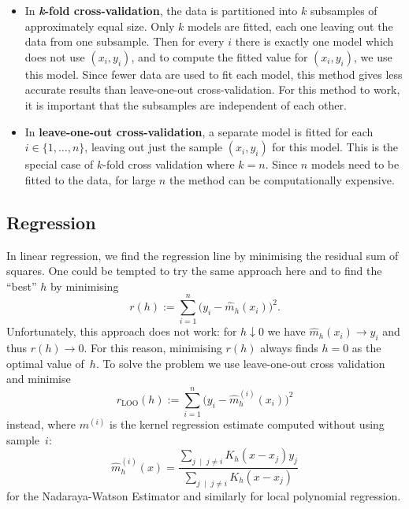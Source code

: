 \documentclass[
  a4paper,
]{article}
\theoremstyle{definition}
\theoremstyle{definition}
\theoremstyle{definition}
\theoremstyle{definition}
\theoremstyle{remark}
\begin{document}
\begin{itemize}
\item
  In \textbf{\emph{k}-fold cross-validation}, the data is partitioned into
  \(k\) subsamples of approximately equal size. Only \(k\) models are fitted,
  each one leaving out the data from one subsample. Then for every \(i\)
  there is exactly one model which does not use \((x_i, y_i)\), and
  to compute the fitted value for \((x_i, y_i)\), we use this model.
  Since fewer data are used to fit each model, this method gives less
  accurate results than leave-one-out cross-validation.
  For this method to work, it is important that the subsamples
  are independent of each other.
\item
  In \textbf{leave-one-out cross-validation}, a separate model is fitted
  for each \(i \in \{1, \ldots, n\}\), leaving out just the sample \((x_i, y_i)\)
  for this model. This is the special case of \(k\)-fold cross validation
  where \(k = n\).
  Since \(n\) models need to be fitted to the data, for large \(n\)
  the method can be computationally expensive.
\end{itemize}

\subsection{Regression}\label{regression}

In linear regression, we find the regression line by minimising
the residual sum of squares. One could be tempted to try the same
approach here and to find the ``best'' \(h\) by minimising
\begin{equation*}
  r(h)
  := \sum_{i=1}^n \bigl( y_i - \hat m_h(x_i) \bigr)^2.
\end{equation*}
Unfortunately, this approach does not work: for \(h \downarrow 0\)
we have \(\hat m_h(x_i) \to y_i\) and thus \(r(h) \to 0\). For this reason,
minimising \(r(h)\) always finds \(h=0\) as the optimal value of~\(h\).
To solve the problem we use leave-one-out cross validation and minimise
\begin{equation*}
  r_\mathrm{LOO}(h)
  := \sum_{i=1}^n \bigl( y_i - \hat m^{(i)}_h(x_i) \bigr)^2
\end{equation*}
instead,
where \(m^{(i)}\) is the kernel regression estimate computed without using
sample~\(i\):
\begin{equation*}
  \hat m_h^{(i)}(x)
  = \frac{\sum_{j \;\mid\; j\neq i} K_h(x - x_j)y_j}{\sum_{j \;\mid\; j\neq i}K_h(x - x_j)}
\end{equation*}
for the Nadaraya-Watson Estimator and similarly for local polynomial
regression.
\end{document}
